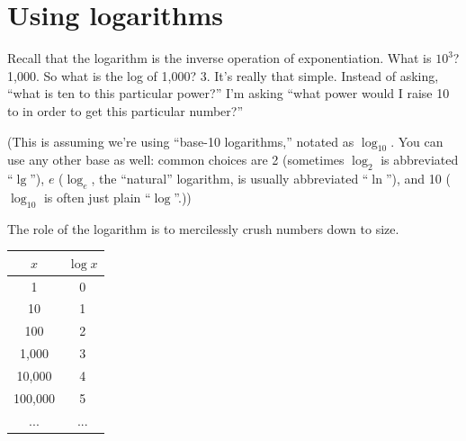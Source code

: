

\chapter{Using logarithms}

Recall that the logarithm is the inverse operation of exponentiation. What is
$10^3$? 1,000. So what is the log of 1,000? 3. It's really that simple.
Instead of asking, ``what is ten to this particular power?'' I'm asking ``what
power would I raise 10 to in order to get this particular number?''

(This is assuming we're using ``base-10 logarithms,'' notated as
$\log_{10}$. You can use any other base as well: common choices are 
2 (sometimes $\log_{2}$ is abbreviated ``$\lg$''),
$e$ ($\log_{e}$, the ``natural'' logarithm, is usually abbreviated ``$\ln$''),
and 10 ($\log_{10}$ is often just plain ``$\log$''.))

The role of the logarithm is to mercilessly crush numbers down to size.

\begin{center}
\begin{tabular}{c|c}
$x$ & $\log x$ \\
\hline
1 & 0 \\
10 & 1 \\
100 & 2 \\
1,000 & 3 \\
10,000 & 4 \\
100,000 & 5 \\
... & ... \\
\end{tabular}
\end{center}

